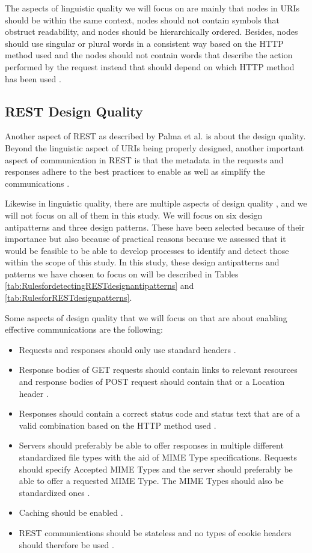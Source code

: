 The aspects of linguistic quality we will focus on are mainly that nodes in URIs should be within the same context, nodes should not contain symbols that obstruct readability, and nodes should be hierarchically ordered. Besides, nodes should use singular or plural words in a consistent way based on the HTTP method used and the nodes should not contain words that describe the action performed by the request instead that should depend on which HTTP method has been used \cite{linguistic}. 


\subsection{REST Design Quality}

Another aspect of REST as described by Palma et al. is about the design quality. Beyond the linguistic aspect of URIs being properly designed, another important aspect of communication in REST is that the metadata in the requests and responses adhere to the best practices to enable as well as simplify the communications \cite{restdissertation}\cite{design}.

Likewise in linguistic quality, there are multiple aspects of design quality \cite{design}, and we will not focus on all of them in this study. We will focus on six design antipatterns and three design patterns. These have been selected because of their importance but also because of practical reasons because we assessed that it would be feasible to be able to develop processes to identify and detect those within the scope of this study. In this study, these design antipatterns and patterns we have chosen to focus on will be described in Tables \ref{tab:RulesfordetectingRESTdesignantipatterns} and \ref{tab:RulesforRESTdesignpatterns}. 

Some aspects of design quality that we will focus on that are about enabling effective communications are the following:

\begin{itemize}
    \item Requests and responses should only use standard headers \cite{design}. 
    \item Response bodies of GET requests should contain links to relevant resources and response bodies of POST request should contain that or a Location header \cite{design}.
    \item Responses should contain a correct status code and status text that are of a valid combination based on the HTTP method used \cite{design}.
    \item Servers should preferably be able to offer responses in multiple different standardized file types with the aid of MIME Type specifications. Requests should specify Accepted MIME Types and the server should preferably be able to offer a requested MIME Type. The MIME Types should also be standardized ones \cite{design}.
    \item Caching should be enabled \cite{restdissertation}\cite{design}.
    \item REST communications should be stateless and no types of cookie headers should therefore be used \cite{restdissertation}\cite{design}.
\end{itemize}

